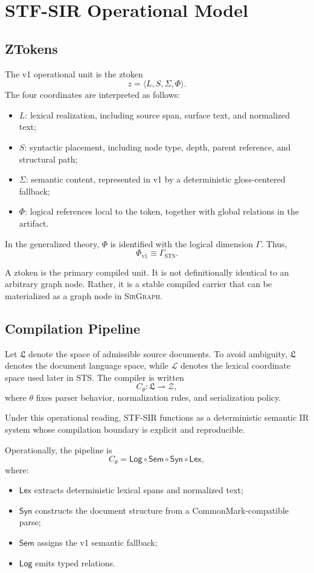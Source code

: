 \documentclass{article}
\newcommand{\STF}{{\normalfont\textsc{STF}}}
\newcommand{\SIR}{{\normalfont\textsc{SIR}}}
\newcommand{\STS}{{\normalfont\textsc{STS}}}
\newcommand{\SirGraphName}{{\normalfont\textsc{SirGraph}}}
\newcommand{\Src}{\mathfrak{L}}
\newcommand{\Lex}{\mathcal{L}}
\newcommand{\ArtSpace}{\mathcal{Z}}
\newcommand{\Comp}{C_\theta}
\begin{document}
\section{\STF{}-\SIR{} Operational Model}

\subsection*{ZTokens}

The v1 operational unit is the ztoken
\[
z = \langle L, S, \Sigma, \Phi \rangle.
\]
The four coordinates are interpreted as follows:
\begin{itemize}
\item \(L\): lexical realization, including source span, surface text, and normalized text;
\item \(S\): syntactic placement, including node type, depth, parent reference, and structural path;
\item \(\Sigma\): semantic content, represented in v1 by a deterministic gloss-centered fallback;
\item \(\Phi\): logical references local to the token, together with global relations in the artifact.
\end{itemize}

In the generalized theory, \(\Phi\) is identified with the logical dimension \(\Gamma\). Thus,
\[
\Phi_{\mathrm{v1}} \equiv \Gamma_{\mathrm{STS}}.
\]

A ztoken is the primary compiled unit. It is not definitionally identical to an arbitrary graph node. Rather, it is a stable compiled carrier that can be materialized as a graph node in \SirGraphName{}.

\subsection*{Compilation Pipeline}

Let \(\Src\) denote the space of admissible source documents. To avoid ambiguity, \(\Src\) denotes the document language space, while \(\Lex\) denotes the lexical coordinate space used later in \STS{}. The compiler is written
\[
\Comp : \Src \rightharpoonup \ArtSpace,
\]
where \(\theta\) fixes parser behavior, normalization rules, and serialization policy.

Under this operational reading, \STF{}-\SIR{} functions as a deterministic semantic IR system whose compilation boundary is explicit and reproducible.

Operationally, the pipeline is
\[
\Comp = \mathsf{Log} \circ \mathsf{Sem} \circ \mathsf{Syn} \circ \mathsf{Lex},
\]
where:
\begin{itemize}
\item \(\mathsf{Lex}\) extracts deterministic lexical spans and normalized text;
\item \(\mathsf{Syn}\) constructs the document structure from a CommonMark-compatible parse;
\item \(\mathsf{Sem}\) assigns the v1 semantic fallback;
\item \(\mathsf{Log}\) emits typed relations.
\end{itemize}
\end{document}
